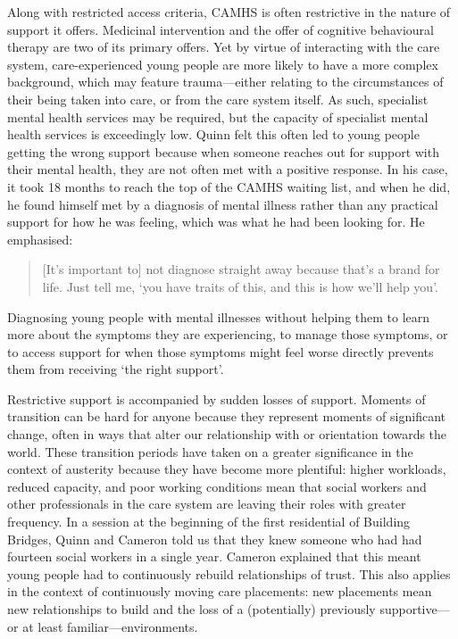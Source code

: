 Along with restricted access criteria, CAMHS is often restrictive in the nature of support it offers. Medicinal intervention and the offer of cognitive behavioural therapy are two of its primary offers. Yet by virtue of interacting with the care system, care-experienced young people are more likely to have a more complex background, which may feature trauma—either relating to the circumstances of their being taken into care, or from the care system itself. As such, specialist mental health services may be required, but the capacity of specialist mental health services is exceedingly low. Quinn felt this often led to young people getting the wrong support because when someone reaches out for support with their mental health, they are not often met with a positive response. In his case, it took 18 months to reach the top of the CAMHS waiting list, and when he did, he found himself met by a diagnosis of mental illness rather than any practical support for how he was feeling, which was what he had been looking for. He emphasised:
\begin{quote}
[It’s important to] not diagnose straight away because that's a brand for life. Just tell me, `you have traits of this, and this is how we'll help you'.
\end{quote}
Diagnosing young people with mental illnesses without helping them to learn more about the symptoms they are experiencing, to manage those symptoms, or to access support for when those symptoms might feel worse directly prevents them from receiving ‘the right support’.

Restrictive support is accompanied by sudden losses of support. Moments of transition can be hard for anyone because they represent moments of significant change, often in ways that alter our relationship with or orientation towards the world. These transition periods have taken on a greater significance in the context of austerity because they have become more plentiful: higher workloads, reduced capacity, and poor working conditions mean that social workers and other professionals in the care system are leaving their roles with greater frequency. In a session at the beginning of the first residential of Building Bridges, Quinn and Cameron told us that they knew someone who had had fourteen social workers in a single year. Cameron explained that this meant young people had to continuously rebuild relationships of trust. This also applies in the context of continuously moving care placements: new placements mean new relationships to build and the loss of a (potentially) previously supportive—or at least familiar—environments.

